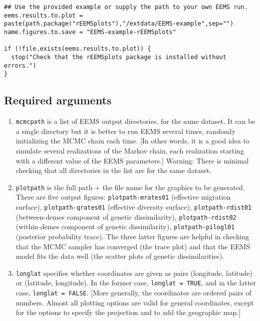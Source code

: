 \documentclass[a4paper,10pt,DIV=15,titlepage,mpinclude=true]{scrartcl}
\newcommand{\keystring}[1]{{\tt #1}}
\begin{document}
\begin{lstlisting}[style=Rcode]
## Use the provided example or supply the path to your own EEMS run.
eems.results.to.plot = paste(path.package("rEEMSplots"),"/extdata/EEMS-example",sep="")
name.figures.to.save = "EEMS-example-rEEMSplots"

if (!file.exists(eems.results.to.plot)) {
  stop("Check that the rEEMSplots package is installed without errors.")
}
\end{lstlisting}

\subsection{Required arguments}

\begin{enumerate}
  \item \keystring{mcmcpath} is a list of EEMS output directories, for the same dataset. It can be a single directory but it is better to run EEMS several times, randomly initializing the MCMC chain each time. [In other words, it is a good idea to simulate several realizations of the Markov chain, each realization starting with a different value of the EEMS parameters.] Warning: There is minimal checking that all directories in the list are for the same dataset.
  \item \keystring{plotpath} is the full path + the file name for the graphics to be generated. There are five output figures: \keystring{plotpath-mrates01} (effective migration surface), \keystring{plotpath-qrates01} (effective diversity surface), \keystring{plotpath-rdist01} (between-demes component of genetic dissimilarity), \keystring{plotpath-rdist02} (within-demes component of genetic dissimilarity), \keystring{plotpath-pilogl01} (posterior probability trace). The three latter figures are helpful in checking that the MCMC sampler has converged (the trace plot) and that the EEMS model fits the data well (the scatter plots of genetic dissimilarities).
  \item \keystring{longlat} specifies whether coordinates are given as pairs (longitude, latitude) or (latitude, longitude). In the former case, \keystring{longlat = TRUE}, and in the latter case, \keystring{longlat = FALSE}. [More generally, the coordinates are ordered pairs of numbers. Almost all plotting options are valid for general coordinates, except for the options to specify the projection and to add the geographic map.]
\end{enumerate}
\end{document}
